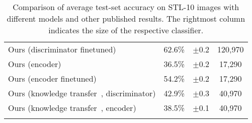 \documentclass[a4paper,12pt]{report}
\begin{document}
\begin{table}[ht!]
\begin{tabular}{l c c|c}
Ours (discriminator finetuned) & 62.6\%  & $\pm$0.2 & 120,970 \\ %
Ours (encoder) & 36.5\%  & $\pm$0.2 & 17,290 \\ %
Ours (encoder finetuned) & 54.2\% & $\pm$0.2 & 17,290 \\ %
\hline
Ours (knowledge transfer~\cite{KnowledgeTransfer}, discriminator) & 42.9\% & $\pm$0.3 & 40,970 \\ %
Ours (knowledge transfer~\cite{KnowledgeTransfer}, encoder) & 38.5\% & $\pm$0.1 & 40,970 \\ %
\Xhline{0.8pt}
\end{tabular}
\caption{Comparison of average test-set accuracy on STL-10 images with different models and other published results. The rightmost column indicates the size of the respective classifier.} \label{tab:comparison_stL10}
\end{table}
\end{document}
